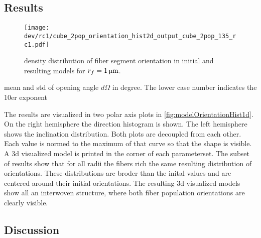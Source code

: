 \subsection{Results}
% 
\begin{figure}[!t]
\centering
\texttt{[image: dev/rc1/cube\_2pop\_orientation\_hist2d\_output\_cube\_2pop\_135\_rc1.pdf]}
\caption[Model orientation histograms]{density distribution of fiber segment orientation in initial and resulting models for $\fiberRadius = \SI{1}{\micro\meter}$.  }
\label{fig:modelOrientation}
\end{figure}
% 
\begin{table}[!b]
\centering
{}
\caption[repo angle results]{mean and std of opening angle $d\Omega$ in degree. The lower case number indicates the 10er exponent}
\end{table}
% 
% 
The results are visualized in two polar axis plots in \cref{fig:modelOrientationHist1d}. On the right hemisphere the direction histogram is shown.
The left hemisphere shows the inclination distribution.
Both plots are decoupled from each other. 
Each value is normed to the maximum of that curve so that the shape is visible.
A 3d visualized model is printed in the corner of each parameterset.
% 
The subset of results show that for all radii the fibers rich the same resulting distribution of orientations. 
These distributions are broder than the inital values and are centered around their initial orientations.
The resulting 3d visualized models show all an interwoven structure, where both fiber population orientations are clearly visible. 
%  
\subsection{Discussion}
%
% 

